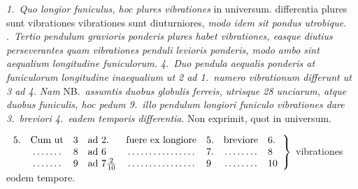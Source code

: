 %
%
\pend
%
\pstart%
%
%
\hspace{1mm}\hspace{-1mm}%
%
%
\textit{1.~Quo longior funiculus,\protect{} hoc plures vibrationes} in universum.
\pend
%
\pstart
{} 
%
differentia plures sunt vibrationes 
%
%
%
vibrationes sunt diuturniores, \textit{modo idem sit pondus utrobique}.
\pend
%
.~\textit{Tertio pendulum\protect{} gravioris ponderis plures habet vibrationes, easque diutius perseverantes quam vibrationes penduli levioris\protect{} ponderis, modo ambo sint aequalium longitudine funiculorum.}
\pend
%
\pstart
\textit{4.~Duo pendula aequalis ponderis at funiculorum longitudine inaequalium ut 2 ad 1.\ numero\protect{} vibrationum differunt ut 3 ad 4.}
\pend 
%
\pstart
\textit{Nam} NB.\ \textit{assumtis duobus globulis ferreis, utrisque 28 unciarum, atque duobus funiculis,\protect{} hoc pedum 9.\ illo} 
%
%
\textit{pendulum longiori funiculo vibrationes dare 3.\ breviori 4.\ eadem temporis differentia}. Non exprimit, quot in universum. 
\pend 
%
\pstart
\rule{0pt}{24pt}%
$\left.\begin{array}{llllllll}
5.&\text{Cum ut}&3&\text{ad } 2.&\text{fuere ex longiore}&5.&\text{breviore}&6.\\
&\dotfill &8&\text{ad } 6&\dotfill &7.&\dotfill &8\\
&\dotfill &9&\text{ad } 7\frac{2}{10}&\dotfill &9&\dotfill &10
\end{array}\right\}$ vibrationes eodem tempore.%
